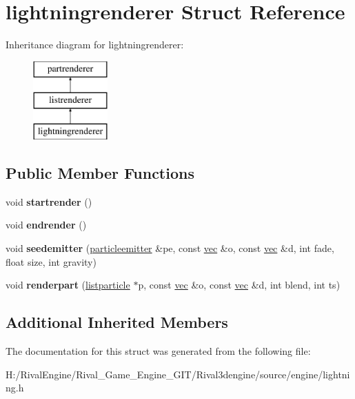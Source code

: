 \hypertarget{structlightningrenderer}{}\section{lightningrenderer Struct Reference}
\label{structlightningrenderer}
Inheritance diagram for lightningrenderer\+:\begin{figure}[H]
\begin{center}
\leavevmode
\includegraphics[height=3.000000cm]{structlightningrenderer}
\end{center}
\end{figure}
\subsection*{Public Member Functions}
\begin{DoxyCompactItemize}
\item 
\mbox{\label{structlightningrenderer_a39475980d11b0bd50d167e1ca9bd9673}} 
void {\bfseries startrender} ()
\item 
\mbox{\label{structlightningrenderer_a68658f1c958c0cc3676bbce99abee958}} 
void {\bfseries endrender} ()
\item 
\mbox{\label{structlightningrenderer_a8dab74787c5c6aa5075baafb3c1a07b6}} 
void {\bfseries seedemitter} (\hyperlink{structparticleemitter}{particleemitter} \&pe, const \hyperlink{structvec}{vec} \&o, const \hyperlink{structvec}{vec} \&d, int fade, float size, int gravity)
\item 
\mbox{\label{structlightningrenderer_ad43ab5001bf1a6acd81ee054d36cb648}} 
void {\bfseries renderpart} (\hyperlink{structlistparticle}{listparticle} $\ast$p, const \hyperlink{structvec}{vec} \&o, const \hyperlink{structvec}{vec} \&d, int blend, int ts)
\end{DoxyCompactItemize}
\subsection*{Additional Inherited Members}


The documentation for this struct was generated from the following file\+:\begin{DoxyCompactItemize}
\item 
H\+:/\+Rival\+Engine/\+Rival\+\_\+\+Game\+\_\+\+Engine\+\_\+\+G\+I\+T/\+Rival3dengine/source/engine/lightning.\+h\end{DoxyCompactItemize}
